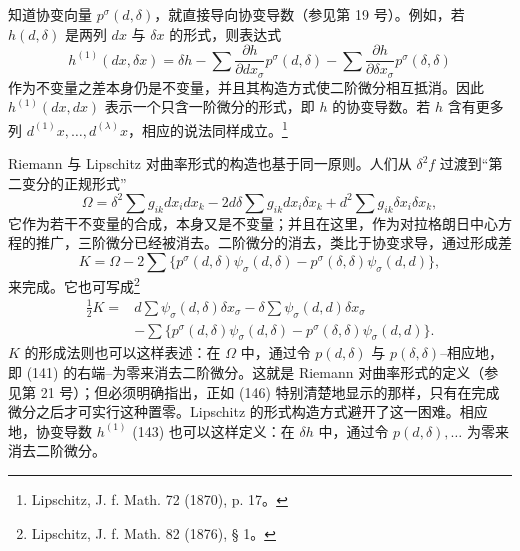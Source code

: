 知道协变向量 $p^\sigma(d,\delta)$，就直接导向协变导数（参见第 19 号）。例如，若 $h(d,\delta)$ 是两列 $dx$ 与 $\delta x$ 的形式，则表达式
\begin{equation}
 h^{(1)}(dx,\delta x)=\delta h-
 \sum\frac{\partial h}{\partial dx_\sigma}p^\sigma(d,\delta)-
 \sum\frac{\partial h}{\partial \delta x_\sigma}p^\sigma(\delta,\delta)
\tag{143}
\end{equation}
作为不变量之差本身仍是不变量，并且其构造方式使二阶微分相互抵消。因此 $h^{(1)}(dx,dx)$ 表示一个只含一阶微分的形式，即 $h$ 的协变导数。若 $h$ 含有更多列 $d^{(1)}x,\ldots,d^{(\lambda)}x$，相应的说法同样成立。\footnote{Lipschitz, J. f. Math. 72 (1870), p. 17。}

Riemann 与 Lipschitz 对曲率形式的构造也基于同一原则。人们从 $\delta^2 f$ 过渡到“第二变分的正规形式”
\begin{equation}
 \Omega=\delta^2\sum g_{ik}dx_i dx_k
 -2d\delta\sum g_{ik}dx_i\delta x_k
 +d^2\sum g_{ik}\delta x_i\delta x_k,
\tag{144}
\end{equation}
它作为若干不变量的合成，本身又是不变量；并且在这里，作为对拉格朗日中心方程的推广，三阶微分已经被消去。二阶微分的消去，类比于协变求导，通过形成差
\begin{equation}
 K=\Omega-2\sum\{p^\sigma(d,\delta)\psi_\sigma(d,\delta)-p^\sigma(\delta,\delta)\psi_\sigma(d,d)\},
\tag{145}
\end{equation}
来完成。它也可写成\footnote{Lipschitz, J. f. Math. 82 (1876), § 1。}
\begin{equation}
\begin{aligned}
 \frac12 K={}&d\sum\psi_\sigma(d,\delta)\delta x_\sigma
 -\delta\sum\psi_\sigma(d,d)\delta x_\sigma\\
 &-\sum\{p^\sigma(d,\delta)\psi_\sigma(d,\delta)-p^\sigma(\delta,\delta)\psi_\sigma(d,d)\}.
\end{aligned}
\tag{146}
\end{equation}
$K$ 的形成法则也可以这样表述：在 $\Omega$ 中，通过令 $p(d,\delta)$ 与 $p(\delta,\delta)$--相应地，即 (141) 的右端--为零来消去二阶微分。这就是 Riemann 对曲率形式的定义（参见第 21 号）；但必须明确指出，正如 (146) 特别清楚地显示的那样，只有在完成微分之后才可实行这种置零。Lipschitz 的形式构造方式避开了这一困难。相应地，协变导数 $h^{(1)}$ (143) 也可以这样定义：在 $\delta h$ 中，通过令 $p(d,\delta),\ldots$ 为零来消去二阶微分。

